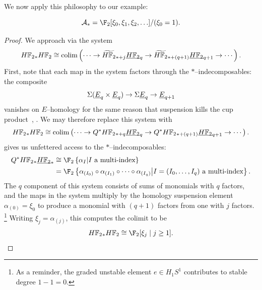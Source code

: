 We now apply this philosophy to our example:
\begin{corollary}\label{StarIndecompsInUDualSteenrodAlg}
\[\mathcal A_* = \F_2[\xi_0, \xi_1, \xi_2, \ldots]/(\xi_0 = 1).\]
\end{corollary}
\begin{proof}
We approach via the system \[\HFtwo_* \HFtwo \cong \colim\left( \cdots \to \widetilde{\HFtwo}_{*+j} \OS{\HFtwo}{q} \to \widetilde{\HFtwo}_{*+(q+1)} \OS{\HFtwo}{q+1} \to \cdots \right).\]
First, note that each map in the system factors through the \(\ast\)--indecomposables: the composite \[\Susp(\OS{E}{q} \times \OS{E}{q}) \to \Susp \OS{E}{q} \to \OS{E}{q+1}\] vanishes on \(E\)--homology for the same reason that suspension kills the cup product~\cite[Corollary 2.18]{BJW}, \cite[Proposition 13.65]{Switzer}.
We may therefore replace this system with \[\HFtwo_* \HFtwo \cong \colim\left( \cdots \to Q^* \HFtwo_{*+q} \OS{\HFtwo}{q} \to Q^* \HFtwo_{*+(q+1)} \OS{\HFtwo}{q+1} \to \cdots \right).\]
 gives us unfettered access to the \(\ast\)--indecomposables:
\begin{align*}
Q^\ast \HFtwo_* \OS{\HFtwo}{*} & \cong \F_2\left\{\alpha_{I} \middle| \text{\(I\) a multi-index}\right\} \\
& = \F_2\left\{ \alpha_{(I_0)} \circ \alpha_{(I_1)} \circ \cdots \circ \alpha_{(I_q)} \middle| \text{\(I = (I_0, \ldots, I_q)\) a multi-index}\right\}.
\end{align*}
The \(q\){\th} component of this system consists of sums of monomials with \(q\) factors, and the maps in the system multiply by the homology suspension element \(\alpha_{(0)} = \xi_0\) to produce a monomial with \((q+1)\) factors from one with \(j\) factors.%
\footnote{%
As a reminder, the graded unstable element \(e \in H_1 S^1\) contributes to stable degree \(1 - 1 = 0\).
}
Writing \(\xi_j = \alpha_{(j)}\), this computes the colimit to be \[\HFtwo_* \HFtwo \cong \F_2[\xi_j \mid j \ge 1]. \qedhere\]
\end{proof}

